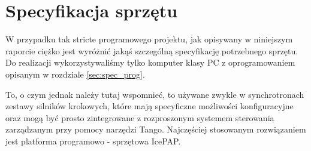 \clearpage
\section{Specyfikacja sprzętu}
\label{sec:spec_sprzet}

\quad W przypadku tak stricte programowego projektu, jak opisywany w niniejszym raporcie ciężko jest wyróżnić jakąś szczególną specyfikację potrzebnego sprzętu. Do realizacji wykorzystywaliśmy tylko komputer klasy PC z oprogramowaniem opisanym w rozdziale \ref{sec:spec_prog}.

To, o czym jednak należy tutaj wspomnieć, to używane zwykle w synchrotronach zestawy silników krokowych, które mają specyficzne możliwości konfiguracyjne oraz mogą być prosto zintegrowane z rozproszonym systemem sterowania zarządzanym przy pomocy narzędzi Tango. Najczęściej stosowanym rozwiązaniem jest platforma programowo - sprzętowa IcePAP.